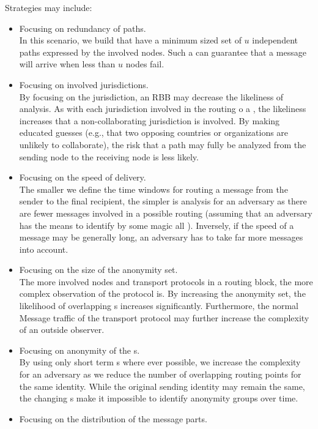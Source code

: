 Strategies may include:
\begin{itemize}
	\item Focusing on redundancy of paths.\\
	      In this scenario, we build  that have a minimum sized set of $u$ independent paths expressed by the involved nodes. Such a  can guarantee that a message will arrive when less than $u$ nodes fail.
	\item Focusing on involved jurisdictions.\\
	      By focusing on the jurisdiction, an RBB may decrease the likeliness of analysis. As with each jurisdiction involved in the routing o a \VortexMessage{}, the likeliness increases that a non-collaborating jurisdiction is involved. By making educated guesses (e.g., that two opposing countries or organizations are unlikely to collaborate), the risk that a path may fully be analyzed from the sending node to the receiving node is less likely.
	\item Focusing on the speed of delivery.\\
	      The smaller we define the time windows for routing a message from the sender to the final recipient, the simpler is analysis for an adversary as there are fewer messages involved in a possible routing (assuming that an adversary has the means to identify by some magic all \VortexMessages). Inversely, if the speed of a message may be generally long, an adversary has to take far more messages into account.
	\item Focusing on the size of the anonymity set.\\
	      The more involved nodes and transport protocols in a routing block, the more complex observation of the protocol is. By increasing the anonymity set, the likelihood of overlapping s increases significantly. Furthermore, the normal Message traffic of the transport protocol may further increase the complexity of an outside observer.
	\item Focusing on anonymity of the s.\\
	      By using only short term s where ever possible, we increase the complexity for an adversary as we reduce the number of overlapping routing points for the same identity. While the original sending identity may remain the same, the changing s make it impossible to identify anonymity groups over time.
	\item Focusing on the distribution of the message parts.\\

\end{itemize}
